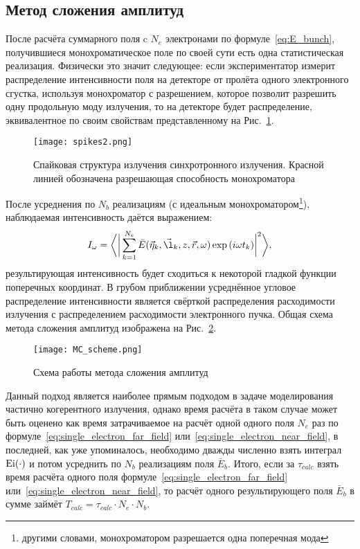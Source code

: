 \subsection{Метод сложения амплитуд}
После расчёта суммарного поля c $N_e$ электронами по формуле~\ref{eq:E_bunch}, получившиеся монохроматическое поле по своей сути есть одна статистическая реализация. Физически это значит следующее: если экспериментатор измерит распределение интенсивности поля на детекторе от пролёта одного электронного сгустка, используя монохроматор с разрешением, которое позволит разрешить одну продольную моду излучения, то на детекторе будет распределение, эквивалентное по своим свойствам представленному на Рис.~\ref{fig:spikes2}. 
\begin{figure}[H]
	\centering 	\texttt{[image: spikes2.png]}
	\caption{Спайковая структура излучения синхротронного излучения. Красной линией обозначена разрешающая способность монохроматора}
	\label{fig:spikes2}
\end{figure}
После усреднения по $N_b$ реализациям (с идеальным монохроматором\footnote{другими словами, монохроматором разрешается одна поперечная мода}), наблюдаемая интенсивность даётся выражением: 
\begin{align}
	I_{\omega} = \bigg \langle \bigg|\sum\limits_{k=1}^{N_e} \bar{E}(\vec{\eta}_k, \vec{\l}_k, z, \vec{r}, \omega) \exp{(i \omega t_k)}\bigg|^2 \bigg \rangle,
	\label{eq:I_MC} 
\end{align}
\noindent результирующая интенсивность будет сходиться к некоторой гладкой функции поперечных координат. В грубом приближении усреднённое угловое распределение интенсивности является свёрткой распределения расходимости излучения с распределением расходимости электронного пучка. Общая схема метода сложения амплитуд изображена на Рис.~\ref{fig:MC_scheme}. 
\begin{figure}[H] 
	\centering 	\texttt{[image: MC\_scheme.png]}
	\caption{Схема работы метода сложения амплитуд}
	\label{fig:MC_scheme}
\end{figure}
Данный подход является наиболее прямым подходом в задаче моделирования частично когерентного излучения, однако время расчёта в таком случае может быть оценено как время затрачиваемое на расчёт одной одного поля $N_e$ раз по формуле~\ref{eq:single_electron_far_field} или~\ref{eq:single_electron_near_field}, в последней, как уже упоминалось, необходимо дважды численно взять интеграл $\textup{Ei}(\cdot)$ и потом усреднить по $N_b$ реализациям поля $\bar{E}_{b}$. Итого, если за $\tau_{calc}$ взять время расчёта одного поля формуле~\ref{eq:single_electron_far_field} или~\ref{eq:single_electron_near_field}, то расчёт одного результирующего поля $\bar{E}_{b}$ в сумме займёт $T_{calc} = \tau_{calc} \cdot N_e \cdot N_b$.

